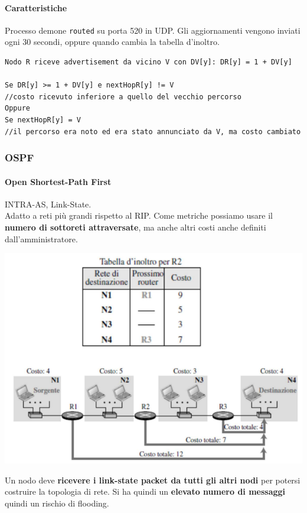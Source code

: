 \documentclass[10pt]{article}
\begin{document}
\paragraph{Caratteristiche} Processo demone \texttt{routed} su porta 520 in UDP. Gli aggiornamenti vengono inviati ogni 30 secondi, oppure quando cambia la tabella d'inoltro.
\begin{lstlisting}
Nodo R riceve advertisement da vicino V con DV[y]: DR[y] = 1 + DV[y]

Se DR[y] >= 1 + DV[y] e nextHopR[y] != V
//costo ricevuto inferiore a quello del vecchio percorso
Oppure
Se nextHopR[y] = V
//il percorso era noto ed era stato annunciato da V, ma costo cambiato
\end{lstlisting}
\pagebreak
\subsubsection{OSPF}
\paragraph{Open Shortest-Path First} INTRA-AS, Link-State.\\
Adatto a reti più grandi rispetto al RIP. Come metriche possiamo usare il \textbf{numero di sottoreti attraversate}, ma anche altri costi anche definiti dall'amministratore.
\begin{center}
\includegraphics[scale=0.7]{ospf.png}
\end{center}
Un nodo deve \textbf{ricevere i link-state packet da tutti gli altri nodi} per potersi costruire la topologia di rete. Si ha quindi un \textbf{elevato numero di messaggi} quindi un rischio di flooding.
\end{document}
